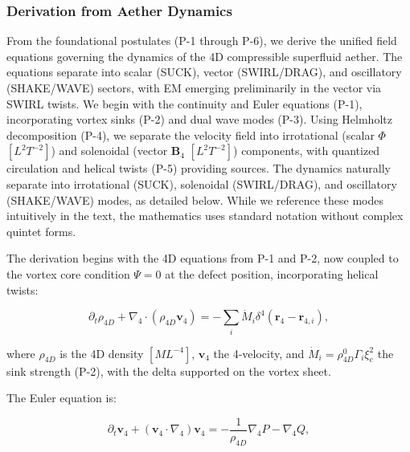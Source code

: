 \subsubsection{Derivation from Aether Dynamics}

From the foundational postulates (P-1 through P-6), we derive the unified field equations governing the dynamics of the 4D compressible superfluid aether. The equations separate into scalar (SUCK), vector (SWIRL/DRAG), and oscillatory (SHAKE/WAVE) sectors, with EM emerging preliminarily in the vector via SWIRL twists. We begin with the continuity and Euler equations (P-1), incorporating vortex sinks (P-2) and dual wave modes (P-3). Using Helmholtz decomposition (P-4), we separate the velocity field into irrotational (scalar $\Phi$ $[L^2 T^{-2}]$) and solenoidal (vector $\mathbf{B}_4$ $[L^2 T^{-2}]$) components, with quantized circulation and helical twists (P-5) providing sources. The dynamics naturally separate into irrotational (SUCK), solenoidal (SWIRL/DRAG), and oscillatory (SHAKE/WAVE) modes, as detailed below. While we reference these modes intuitively in the text, the mathematics uses standard notation without complex quintet forms.

The derivation begins with the 4D equations from P-1 and P-2, now coupled to the vortex core condition $\Psi=0$ at the defect position, incorporating helical twists:

\begin{equation}
\partial_t \rho_{4D} + \nabla_4 \cdot (\rho_{4D} \mathbf{v}_4) = -\sum_i \dot{M}_i \delta^4(\mathbf{r}_4 - \mathbf{r}_{4,i}),
\end{equation}

where $\rho_{4D}$ is the 4D density $[M L^{-4}]$, $\mathbf{v}_4$ the 4-velocity, and $\dot{M}_i = \rho_{4D}^0 \Gamma_i \xi_c^2$ the sink strength (P-2), with the delta supported on the vortex sheet.

The Euler equation is:

\begin{equation}
\partial_t \mathbf{v}_4 + (\mathbf{v}_4 \cdot \nabla_4) \mathbf{v}_4 = -\frac{1}{\rho_{4D}} \nabla_4 P - \nabla_4 Q,
\end{equation}


